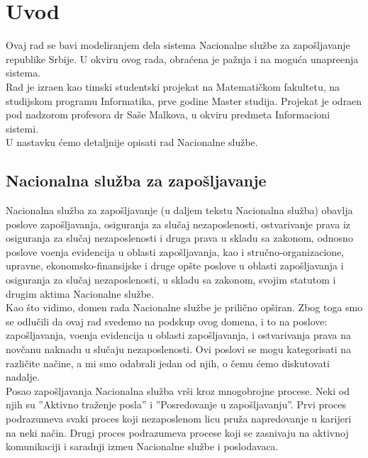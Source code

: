 \section{Uvod}

Ovaj rad se bavi modeliranjem dela sistema Nacionalne slu\v zbe za zapo\v sljavanje republike Srbije. U okviru ovog rada, obra\' cena je pa\v znja i na mogu\' ca unapre\dj enja sistema.\\

Rad je izra\dj en kao timski studentski projekat na Matemati\v ckom fakultetu, na studijskom programu Informatika, prve godine Master studija. Projekat je odra\dj en pod nadzorom profesora dr Sa\v se Malkova, u okviru predmeta Informacioni sistemi.\\

U nastavku \' cemo detaljnije opisati rad Nacionalne slu\v zbe.

\subsection{Nacionalna slu\v zba za zapo\v sljavanje}

Nacionalna slu\v zba za zapo\v sljavanje (u daljem tekstu Nacionalna slu\v zba) obavlja poslove zapo\v sljavanja, osiguranja za slu\v caj nezaposlenosti, ostvarivanje prava iz osiguranja za slu\v caj nezaposlenosti i druga prava u skladu sa zakonom, odnosno poslove vo\dj enja evidencija u oblasti zapo\v sljavanja, kao i stru\v cno-organi\-zacione, upravne, ekonomsko-finansijske i druge op\v ste poslove u oblasti zapo\v sljavanja i osiguranja za slu\v caj nezaposlenosti, u skladu sa zakonom, svojim statutom i drugim aktima Nacionalne slu\v zbe.\\

Kao \v sto vidimo, domen rada Nacionalne slu\v zbe je prili\v cno op\v siran. Zbog toga smo se odlu\v cili da ovaj rad svedemo na podskup ovog domena, i to na poslove: zapo\v sljavanja, vo\dj enja evidencija u oblasti zapo\v sljavanja, i ostvarivanja prava na nov\v canu naknadu u slu\v caju nezaposlenosti. Ovi poslovi se mogu kategorisati na razli\v cite na\v cine, a mi smo odabrali jedan od njih, o \v cemu \' cemo diskutovati nadalje.\\

Posao zapo\v sljavanja Nacionalna slu\v zba vr\v si kroz mnogobrojne procese. Neki od njih su ''Aktivno tra\v zenje posla'' i ''Posredovanje u zapo\v sljavanju''. Prvi proces podrazumeva svaki proces koji nezaposlenom licu pru\v za napredovanje u karijeri na neki na\v cin. Drugi proces podrazumeva procese koji se zasnivaju na aktivnoj komunikaciji i saradnji izme\dj u Nacionalne slu\v zbe i poslodavaca.\\

